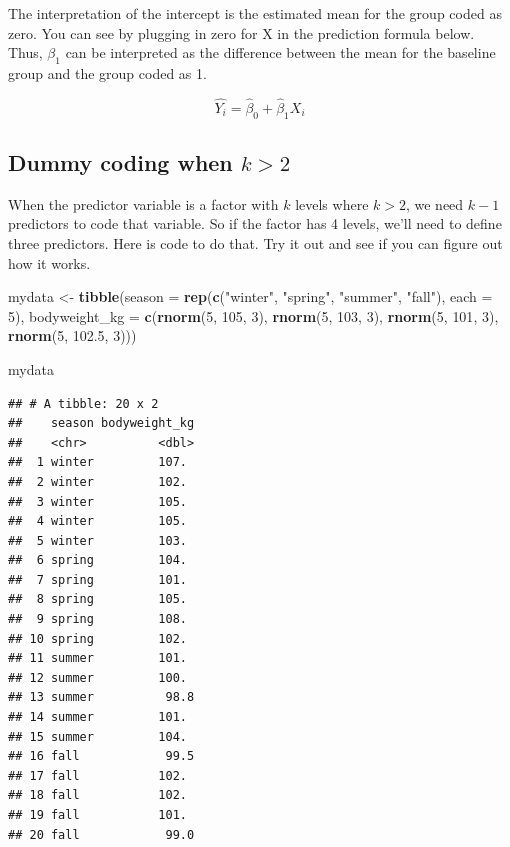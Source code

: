 \documentclass[]{book}
\newenvironment{Shaded}{\begin{snugshade}}{\end{snugshade}}
\newcommand{\DataTypeTok}[1]{\textcolor[rgb]{0.13,0.29,0.53}{#1}}
\newcommand{\DecValTok}[1]{\textcolor[rgb]{0.00,0.00,0.81}{#1}}
\newcommand{\FloatTok}[1]{\textcolor[rgb]{0.00,0.00,0.81}{#1}}
\newcommand{\KeywordTok}[1]{\textcolor[rgb]{0.13,0.29,0.53}{\textbf{#1}}}
\newcommand{\NormalTok}[1]{#1}
\newcommand{\StringTok}[1]{\textcolor[rgb]{0.31,0.60,0.02}{#1}}
\begin{document}
The interpretation of the intercept is the estimated mean for the group coded as zero. You can see by plugging in zero for X in the prediction formula below. Thus, \(\beta_1\) can be interpreted as the difference between the mean for the baseline group and the group coded as 1.

\[\hat{Y_i} = \hat{\beta}_0 + \hat{\beta}_1 X_i \]

\hypertarget{dummy-coding-when-k-2}{%
\subsection{\texorpdfstring{Dummy coding when \(k > 2\)}{Dummy coding when k \textgreater{} 2}}\label{dummy-coding-when-k-2}}

When the predictor variable is a factor with \(k\) levels where \(k>2\), we need \(k-1\) predictors to code that variable. So if the factor has 4 levels, we'll need to define three predictors. Here is code to do that. Try it out and see if you can figure out how it works.

\begin{Shaded}
\begin{Highlighting}[]
\NormalTok{mydata <-}\StringTok{ }\KeywordTok{tibble}\NormalTok{(}\DataTypeTok{season =} \KeywordTok{rep}\NormalTok{(}\KeywordTok{c}\NormalTok{(}\StringTok{"winter"}\NormalTok{, }\StringTok{"spring"}\NormalTok{, }\StringTok{"summer"}\NormalTok{, }\StringTok{"fall"}\NormalTok{), }\DataTypeTok{each =} \DecValTok{5}\NormalTok{),}
                 \DataTypeTok{bodyweight_kg =} \KeywordTok{c}\NormalTok{(}\KeywordTok{rnorm}\NormalTok{(}\DecValTok{5}\NormalTok{, }\DecValTok{105}\NormalTok{, }\DecValTok{3}\NormalTok{),}
                                   \KeywordTok{rnorm}\NormalTok{(}\DecValTok{5}\NormalTok{, }\DecValTok{103}\NormalTok{, }\DecValTok{3}\NormalTok{),}
                                   \KeywordTok{rnorm}\NormalTok{(}\DecValTok{5}\NormalTok{, }\DecValTok{101}\NormalTok{, }\DecValTok{3}\NormalTok{),}
                                   \KeywordTok{rnorm}\NormalTok{(}\DecValTok{5}\NormalTok{, }\FloatTok{102.5}\NormalTok{, }\DecValTok{3}\NormalTok{)))}

\NormalTok{mydata}
\end{Highlighting}
\end{Shaded}

\begin{verbatim}
## # A tibble: 20 x 2
##    season bodyweight_kg
##    <chr>          <dbl>
##  1 winter         107. 
##  2 winter         102. 
##  3 winter         105. 
##  4 winter         105. 
##  5 winter         103. 
##  6 spring         104. 
##  7 spring         101. 
##  8 spring         105. 
##  9 spring         108. 
## 10 spring         102. 
## 11 summer         101. 
## 12 summer         100. 
## 13 summer          98.8
## 14 summer         101. 
## 15 summer         104. 
## 16 fall            99.5
## 17 fall           102. 
## 18 fall           102. 
## 19 fall           101. 
## 20 fall            99.0
\end{verbatim}
\end{document}
